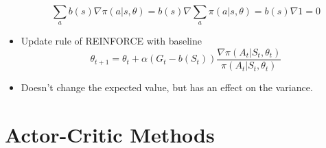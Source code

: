\documentclass[a4paper]{article}
\begin{document}
\begin{itemize}
    \begin{equation*}
        \sum_ab(s)\nabla \pi(a|s,\theta)=b(s)\nabla \sum_a\pi(a|s,\theta)=b(s)\nabla 1=0
    \end{equation*}
    \item Update rule of REINFORCE with baseline
    \begin{equation*}
        \theta_{t+1}=\theta_t+\alpha (G_t-b(S_t))\frac{\nabla \pi(A_t|S_t,\theta_t)}{\pi(A_t|S_t,\theta_t)}
    \end{equation*}
    \item Doesn't change the expected value, but has an effect on the variance.
\end{itemize}

\section{Actor-Critic Methods}
\end{document}
